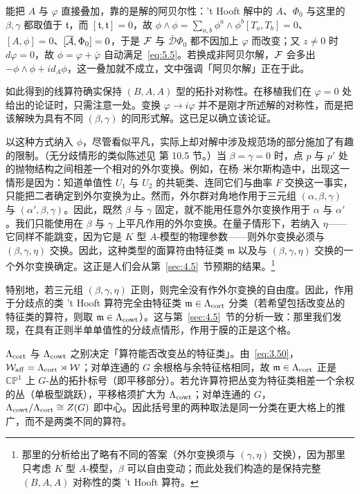 \begin{yizhu}[物理图像补充]
能把 $A$ 与 $\varphi$ 直接叠加，靠的是解的阿贝尔性：'t Hooft 解中的 $A$、$\Phi_0$ 与这里的 $\beta,\gamma$ 都取值于 $\mathfrak t$，而 $[\mathfrak t,\mathfrak t]=0$，故 $\phi\wedge\phi=\sum_{a,b}\phi^a\wedge\phi^b[T_a,T_b]=0$、$[A,\phi]=0$、$[\overline{{\mathcal A}},\Phi_0]=0$，于是 ${\mathcal F}$ 与 $\bar{\mathcal D}\Phi_0$ 都不因加上 $\varphi$ 而改变；又 $z\ne 0$ 时 $d\varphi=0$，故 $\phi=\varphi+\bar\varphi$ 自动满足~\eqref{eq:5.5}。若换成非阿贝尔解，${\mathcal F}$ 会多出 $-\phi\wedge\phi+i d_A\phi$，这一叠加就不成立，文中强调「阿贝尔解」正在于此。
\end{yizhu}

如此得到的线算符确实保持 $(B,A,A)$ 型的拓扑对称性。在移植我们在 $\varphi=0$ 处给出的论证时，只需注意一处。变换 $\varphi\to i\varphi$ 并不是刚才所述解的对称性，而是把该解映为具有不同 $(\beta,\gamma)$ 的同形式解。这已足以确立该论证。

以这种方式纳入 $\phi$，尽管看似平凡，实际上却对解中涉及规范场的部分施加了有趣的限制。（无分歧情形的类似陈述见 \cite{ref8} 第 10.5 节。）当 $\beta=\gamma=0$ 时，点 $p$ 与 $p'$ 处的抛物结构之间相差一个相对的外尔变换。例如，在杨–米尔斯构造中，出现这一情形是因为：知道单值性 $U_1$ 与 $U_2$ 的共轭类、连同它们与曲率 $F$ 交换这一事实，只能把二者确定到外尔变换为止。然而，外尔群对角地作用于三元组 $(\alpha,\beta,\gamma)$ 与 $(\alpha',\beta,\gamma)$。因此，既然 $\beta$ 与 $\gamma$ 固定，就不能用任意外尔变换作用于 $\alpha$ 与 $\alpha'$。我们只能使用在 $\beta$ 与 $\gamma$ 上平凡作用的外尔变换。在量子情形下，若纳入 $\eta$——它同样不能跳变，因为它是 $K$ 型 $A$-模型的物理参数——则外尔变换必须与 $(\beta,\gamma,\eta)$ 交换。因此，这种类型的面算符由特征类 $\mathfrak{m}$ 以及与 $(\beta,\gamma,\eta)$ 交换的一个外尔变换确定。这正是人们会从第~\ref{sec:4.5}~节预期的结果。\footnote{那里的分析给出了略有不同的答案（外尔变换须与 $(\gamma,\eta)$ 交换），因为那里只考虑 $K$ 型 $A$-模型，$\beta$ 可以自由变动；而此处我们构造的是保持完整 $(B,A,A)$ 对称性的类 't Hooft 算符。}

特别地，若三元组 $(\beta,\gamma,\eta)$ 正则，则完全没有作外尔变换的自由度。因此，作用于分歧点的类 't Hooft 算符完全由特征类 $\mathfrak{m}\in \Lambda_{\rm cort}$ 分类（若希望包括改变丛的特征类的算符，则取 $\mathfrak{m}\in \Lambda_{\rm cowt}$）。这与第~\ref{sec:4.5}~节的分析一致：那里我们发现，在具有正则半单单值性的分歧点情形，作用于膜的正是这个格。

\begin{yizhu}[含糊点拨]
$\Lambda_{\rm cort}$ 与 $\Lambda_{\rm cowt}$ 之别决定「算符能否改变丛的特征类」。由~\eqref{eq:3.50}，${\mathcal W}_{\rm aff}=\Lambda_{\rm cort}\rtimes{\mathcal W}$；对单连通的 $G$ 余根格与余特征格相同，故 $\mathfrak m\in\Lambda_{\rm cort}$ 正是 $\mathbb{CP}^1$ 上 $G$-丛的拓扑标号（即平移部分）。若允许算符把丛变为特征类相差一个余权的丛（单极型跳跃），平移格须扩大为 $\Lambda_{\rm cowt}$；对单连通的 $G$，$\Lambda_{\rm cowt}/\Lambda_{\rm cort}\cong Z(G)$ 即中心。因此括号里的两种取法是同一分类在更大格上的推广，而不是两类不同的算符。
\end{yizhu}

